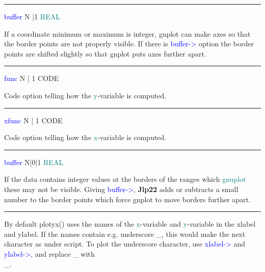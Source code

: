 \hrule 
\vspace{0.3cm} 
\noindent \textcolor{blue}{buffer}  \tabto{3cm} N |1  \tabto{5cm}  \textcolor{teal}{REAL}  \tabto{7cm} 
\begin{changemargin}{3cm}{0cm} 
\noindent  If a coordinate minimum or maximum is integer, gnplot can make 
axes so that the border points are not properly visible. If there is \textcolor{blue}{buffer->} 
option the border points are shifted slightly so that gnplot puts axes further apart. 
\end{changemargin} 
\vspace{0.3cm} 
\hrule 
\vspace{0.3cm} 
\noindent \textcolor{blue}{func} \tabto{3cm}  N | 1  \tabto{5cm}   CODE  \tabto{7cm} 
\begin{changemargin}{3cm}{0cm} 
\noindent   Code option telling how the \textcolor{teal}{y}-variable is computed. 
\end{changemargin} 
\vspace{0.3cm} 
\hrule 
\vspace{0.3cm} 
\noindent \textcolor{blue}{xfunc} \tabto{3cm}  N | 1  \tabto{5cm}   CODE  \tabto{7cm} 
\begin{changemargin}{3cm}{0cm} 
\noindent   Code option telling how the \textcolor{teal}{x}-variable is computed. 
\end{changemargin} 
\vspace{0.3cm} 
\hrule 
\vspace{0.3cm} 
\noindent \textcolor{blue}{buffer}  \tabto{3cm}  N|0|1 \tabto{5cm}   \textcolor{teal}{REAL} \tabto{7cm} 
\begin{changemargin}{3cm}{0cm} 
\noindent  If the data contains integer values at the borders of the ranges which \textcolor{teal}{gnuplot} 
these may not be visible. Giving \textcolor{blue}{buffer->}, \textbf{Jlp22} adds or subtracts a small number to the border 
points which force gnplot to move borders further apart. 
\end {changemargin} 
\hrule 
\vspace{0.2cm} 
\begin{note} 
By default \textcolor{VioletRed}{plotyx}() uses the names of the \textcolor{teal}{x}-variable and \textcolor{teal}{y}-variable 
in the xlabel and ylabel. If the names contain e.g. underscore \_, this would make 
the next character as under script. To plot the underscore character, 
use \textcolor{blue}{xlabel->} 	and \textcolor{blue}{ylabel->}, and replace \_ with \\\_. 
\end{note} 
